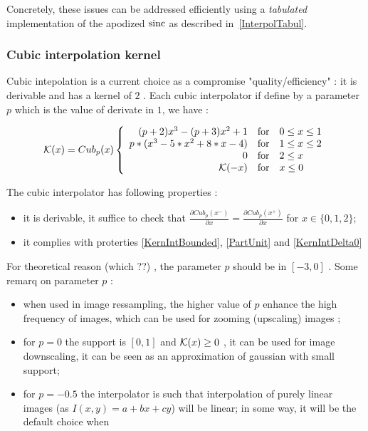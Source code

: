 Concretely, these issues can be addressed efficiently  using a \emph{tabulated} implementation
of the apodized $\operatorname{sinc}$ as described in~\ref{InterpolTabul}.



\subsubsection{Cubic interpolation kernel}

\label{CubicInterpol}



Cubic intepolation is a current choice as a compromise "quality/efficiency" : it is derivable and has a kernel of $2$ .
Each cubic interpolator if define by a parameter $p$ which is the value of derivate in $1$, we have :

\begin{equation}
\mathcal K(x) = Cub_p(x)
\left\{ \begin{array}{rcl}
(p+2 ) x^3 -(p+3)x^2+1        &   \mbox{for} &  0 \leq x \leq 1 \\ 
p*(x^3 - 5 * x^2 + 8* x -4)   &   \mbox{for} &  1 \leq x \leq 2 \\
0                             &   \mbox{for} &  2 \leq x \\
\mathcal K(-x)                    &   \mbox{for} &   x \leq 0 \\
\end{array}\right.
\end{equation}


The cubic interpolator has following properties :

\begin{itemize}
    \item  it is derivable, it suffice to check that $\frac{\partial Cub_p(x^-)}{\partial x} = \frac{\partial Cub_p(x ^+)}{\partial x} $  
           for $x \in \{0,1,2\}$;
    \item  it complies with proterties \ref{KernIntBounded},   \ref{PartUnit} and \ref{KernIntDelta0}  
\end{itemize}


For theoretical reason (which ??) , the parameter $p$ should be in $[-3,0]$ . Some remarq on parameter $p$ :

\begin{itemize}
    \item  when used in image ressampling, the higher value of  $p$ enhance the high frequency of images, which can be used
           for zooming (upscaling) images ;

    \item  for  $p=0$  the support is $[0,1]$ and $\mathcal K(x) \geq 0$ , it can be used for image downscaling,
           it can be seen as an approximation of gaussian with small support;

    \item  for  $p= -0.5$  the interpolator  is such that interpolation of purely linear images (as $I(x,y)=a+bx+cy$)
           will  be linear; in some way, it will be the default choice when 
\end{itemize}

